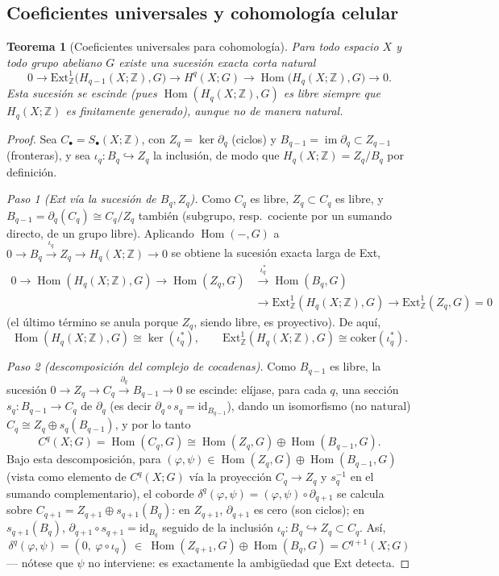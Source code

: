 \documentclass[11pt,a4paper]{article}
\theoremstyle{plain}
\newtheorem{theorem}{Teorema}[section]
\theoremstyle{definition}
\theoremstyle{remark}
\newcommand{\ZZ}{\mathbb Z}
\DeclareMathOperator{\im}{im}
\DeclareMathOperator{\Hom}{Hom}
\begin{document}
\subsection{Coeficientes universales y cohomología celular}

\begin{theorem}[Coeficientes universales para cohomología]
\label{thm:coeficientes-universales}
Para todo espacio $X$ y todo grupo abeliano $G$ existe una sucesión exacta
corta natural
\[
0\to\mathrm{Ext}^1_\ZZ\big(H_{q-1}(X;\ZZ),G\big)\to H^q(X;G)\to\Hom\big(H_q(X;\ZZ),G\big)\to0.
\]
Esta sucesión se escinde (pues $\Hom(H_q(X;\ZZ),G)$ es libre siempre que
$H_q(X;\ZZ)$ es finitamente generado), aunque no de manera natural.
\end{theorem}

\begin{proof}
Sea $C_\bullet=S_\bullet(X;\ZZ)$, con $Z_q=\ker\partial_q$ (ciclos) y
$B_{q-1}=\im\partial_q\subset Z_{q-1}$ (fronteras), y sea
$\iota_q:B_q\hookrightarrow Z_q$ la inclusión, de modo que
$H_q(X;\ZZ)=Z_q/B_q$ por definición.

\emph{Paso 1 (Ext vía la sucesión de $B_q,Z_q$).} Como $C_q$ es libre,
$Z_q\subset C_q$ es libre, y $B_{q-1}=\partial_q(C_q)\cong C_q/Z_q$
también (subgrupo, resp.\ cociente por un sumando directo, de un grupo
libre). Aplicando $\Hom(-,G)$ a
$0\to B_q\xrightarrow{\iota_q}Z_q\to H_q(X;\ZZ)\to0$ se obtiene la
sucesión exacta larga de Ext,
\[
\begin{aligned}
0\to\Hom(H_q(X;\ZZ),G)\to\Hom(Z_q,G)&\xrightarrow{\iota_q^*}\Hom(B_q,G)\\
&\to\mathrm{Ext}^1_\ZZ(H_q(X;\ZZ),G)\to\mathrm{Ext}^1_\ZZ(Z_q,G)=0
\end{aligned}
\]
(el último término se anula porque $Z_q$, siendo libre, es proyectivo).
De aquí,
\[
\Hom(H_q(X;\ZZ),G)\cong\ker(\iota_q^*), \qquad \mathrm{Ext}^1_\ZZ(H_q(X;\ZZ),G)\cong\mathrm{coker}(\iota_q^*). \tag{$*$}
\]

\emph{Paso 2 (descomposición del complejo de cocadenas).} Como
$B_{q-1}$ es libre, la sucesión $0\to Z_q\to C_q\xrightarrow{\partial_q}B_{q-1}\to0$
se escinde: elíjase, para cada $q$, una sección $s_q:B_{q-1}\to C_q$ de
$\partial_q$ (es decir $\partial_q\circ s_q=\mathrm{id}_{B_{q-1}}$), dando
un isomorfismo (no natural) $C_q\cong Z_q\oplus s_q(B_{q-1})$, y por lo
tanto
\[
C^q(X;G)=\Hom(C_q,G)\cong\Hom(Z_q,G)\oplus\Hom(B_{q-1},G).
\]
Bajo esta descomposición, para $(\varphi,\psi)\in\Hom(Z_q,G)\oplus\Hom(B_{q-1},G)$
(vista como elemento de $C^q(X;G)$ vía la proyección $C_q\to Z_q$ y
$s_q^{-1}$ en el sumando complementario), el coborde
$\delta^q(\varphi,\psi)=(\varphi,\psi)\circ\partial_{q+1}$ se calcula
sobre $C_{q+1}=Z_{q+1}\oplus s_{q+1}(B_q)$: en $Z_{q+1}$, $\partial_{q+1}$
es cero (son ciclos); en $s_{q+1}(B_q)$, $\partial_{q+1}\circ s_{q+1}=\mathrm{id}_{B_q}$
seguido de la inclusión $\iota_q:B_q\hookrightarrow Z_q\subset C_q$. Así,
\[
\delta^q(\varphi,\psi)=(0,\ \varphi\circ\iota_q)\ \in\ \Hom(Z_{q+1},G)\oplus\Hom(B_q,G)=C^{q+1}(X;G)
\]
--- nótese que $\psi$ no interviene: es exactamente la ambigüedad que
Ext detecta.


\end{proof}
\end{document}

